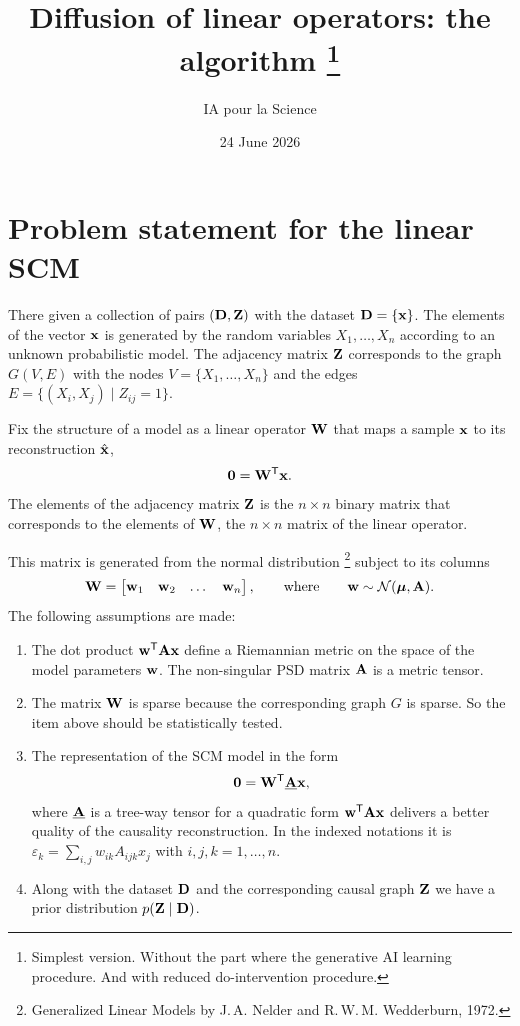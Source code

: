\documentclass[12pt]{article}
\title{Diffusion of linear operators: the algorithm%
\footnote{Simplest version. Without the part where the generative AI learning procedure. And with reduced do-intervention procedure.}}
\author{IA pour la Science}
\date{24 June 2026}
\begin{document}
\maketitle

\section*{Problem statement for the linear SCM}

There given a collection of pairs $(\mathbf{D}, \mathbf{Z})$ with the dataset $\mathbf{D}=\{\mathbf{x}\}$. The elements of the vector $\mathbf{x}$ is generated by the random variables $X_1,\dots,X_n$ according to an unknown probabilistic model.
The adjacency matrix $\mathbf{Z}$ corresponds to the graph $G(V,E)$ with the nodes $V=\{X_1,\dots,X_n\}$ and the edges $E=\{(X_i,X_j)\mid Z_{ij}=1\}$.

Fix the structure of a model as a linear operator $\mathbf{W}$ that maps a sample $\mathbf{x}$ to its reconstruction $\hat{\mathbf{x}}$,
\[
     \boldsymbol{0} = \mathbf{W}^{\mathsf{T}}\mathbf{x}.
\]
The elements of the adjacency matrix $\mathbf{Z}$ is the $n\times n$ binary matrix that corresponds to the elements of $\mathbf{W}$, the $n\times n$ matrix of the linear operator.


This matrix is generated from the normal distribution%
\footnote{Generalized Linear Models by J.\,A. Nelder and R.\,W.\,M. Wedderburn, 1972.}
subject to its columns
\[
    \mathbf{W} = \begin{bmatrix}
        \mathbf{w}_1 & \mathbf{w}_2 & \dots & \mathbf{w}_n
    \end{bmatrix},
    \qquad\text{where}\qquad\mathbf{w} \sim \mathcal{N}(\boldsymbol{\mu}, \mathbf{A}).
\]
The following assumptions are made:
\begin{enumerate}
    \item The dot product $\mathbf{w}^{\mathsf{T}}\mathbf{A}\mathbf{x}$ define a Riemannian metric on the space of the model parameters $\mathbf{w}$.
    The non-singular PSD matrix $\mathbf{A}$ is a metric tensor.
    \item The matrix $\mathbf{W}$ is sparse because the corresponding graph $G$ is sparse.
    So the item above should be statistically tested.
    \item The representation of the SCM model in the form
    \[
      \boldsymbol{0} = \mathbf{W}^{\mathsf{T}}\underline{\mathbf{A}} \mathbf{x},
    \]
    where $\underline{\mathbf{A}}$ is a tree-way tensor for a quadratic form $\mathbf{w}^{\mathsf{T}}\mathbf{A}\mathbf{x}$ delivers a better quality of the causality reconstruction.
    In the indexed notations it is $\varepsilon_k = \sum_{i,j} w_{ik}A_{ijk}x_j$ with $i,j,k = 1,\dots,n$.
    \item Along with the dataset $\mathbf{D}$ and the corresponding causal graph $\mathbf{Z}$ we have a prior distribution $p(\mathbf{Z}\mid \mathbf{D})$.
\end{enumerate}
\end{document}
